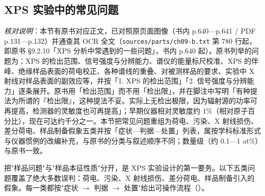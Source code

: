 \subsection{XPS 实验中的常见问题}
\label{sec:ch09-problems}

\emph{核对说明}：本节有原书对应正文，已对照原页面图像（书内 p.640—p.641 / PDF p.131—p.132）并通查其 OCR 全文（\texttt{sources/parts/ch09-b.txt} 第 780 行起，即原书 §9.2.10「XPS 分析中常遇到的一些问题」，书内 p.640 起）。原书列举的问题为：XPS 的检出范围、信号强度与分辨能力、谱仪的能量标尺校准、XPS 的伴峰、绝缘样品表面的荷电校正、各种谱线的重叠、对被测样品的要求、实验中 X 射线对样品表面的副效应等，并按「1. XPS 的检出范围」「2. 信号强度与分辨能力」逐条展开。原书用「检出范围」而不用「检出限」，并在脚注中写明「有种提法为所谓的『检出限』，这种提法不妥。实际上无检出极限，因为辐射源的功率可再提高，检测器的灵敏度也可再提高」；早期仪器相对灵敏度约 1\%（相对原子百分比），现在可达约千分之一。本节把常见问题重组为荷电、污染、X 射线损伤、差分荷电、样品制备假象五类并按「症状—判据—处置」列表，属按学科标准形式与仪器惯例的改编补充，与原书的分类与叙述顺序不同；数量级（约 0.1—1 at\%）与原书一致。

\begin{probout}
把"样品问题"与"样品本征性质"分开，是 XPS 实验设计的第一要务。以下五类问题覆盖了绝大多数误判：荷电、污染、X 射线损伤、差分荷电、样品制备引入的假象。每一类都按"症状 $\to$ 判据 $\to$ 处置"给出可操作流程（）。
\end{probout}

